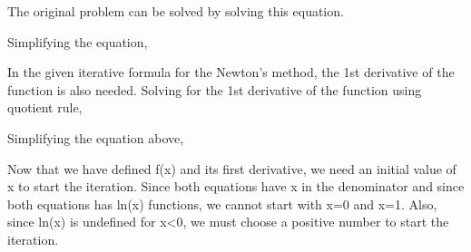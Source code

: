 \documentclass[a4paper]{article}
\begin{document}
\begin{center}
\end{center}

The original problem can be solved by solving this equation.

\begin{center}
\end{center}

Simplifying the equation,

\begin{center}
\end{center}
\begin{center}
\end{center}

In the given iterative formula for the Newton's method, the 1st derivative of the function is also needed. Solving for the 1st derivative of the function using quotient rule, 

\begin{center}
\end{center}

Simplifying the equation above, 

\begin{center}
\end{center}

Now that we have defined f(x) and its first derivative, we need an initial value of x to start the iteration. Since both equations have x in the denominator and since both equations has ln(x) functions, we cannot start with x=0 and x=1. Also, since ln(x) is undefined for x<0, we must choose a positive number to start the iteration. 
\\
\\
\end{document}
